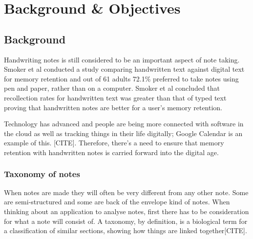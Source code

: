 \chapter{Background \& Objectives}






\section{Background}
Handwriting notes is still considered to be an important aspect of note taking. Smoker et al \cite{citeulike:13988059} conducted a study comparing handwritten text against digital text for memory retention and out of 61 adults 72.1\% preferred to take notes using pen and paper, rather than on a computer. Smoker et al concluded that recollection rates for handwritten text was greater than that of typed text proving that handwritten notes are better for a user's memory retention.

Technology has advanced and people are being more connected with software in the cloud as well as tracking things in their life digitally; Google Calendar is an example of this. [CITE]. Therefore, there's a need to ensure that memory retention with handwritten notes is carried forward into the digital age.


\subsection{Taxonomy of notes}
When notes are made they will often be very different from any other note. Some are semi-structured and some are back of the envelope kind of notes. When thinking about an application to analyse notes, first there has to be consideration for what a note will consist of. A taxonomy, by definition, is a biological term for a classification of similar sections, showing how things are linked together[CITE].

